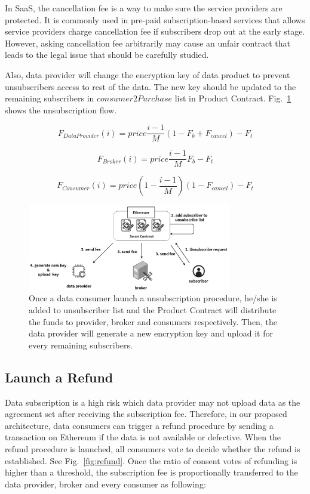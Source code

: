 \documentclass[conference]{IEEEtran}
\begin{document}
In SaaS, the cancellation fee is a way to make sure the service providers are protected. It is commonly used in pre-paid subscription-based services that allows service providers charge cancellation fee if subscribers drop out at the early stage. However, asking cancellation fee arbitrarily may cause an unfair contract that leads to the legal issue that should be carefully studied.

Also, data provider will change the encryption key of data product to prevent unsubscribers access to rest of the data. The new key should be updated to the remaining subscribers in $consumer2Purchase$ list in Product Contract. Fig.~\ref{fig:unsubscribe} shows the unsubscription flow.

\begin{equation}
\label{equation:unsubscribe_provider}
    F_{DataProvider}(i) = price \frac{i-1}{M} (1-F_{b}+F_{cancel}) -F_{t} 
\end{equation}

\begin{equation}
\label{equation:unsubscribe_broker}
    F_{Broker}(i) = price \frac{i-1}{M} F_{b} -F_{t}
\end{equation}

\begin{equation}
\label{equation:unsubscribe_consumer}
    F_{Consumer}(i) = price (1-\frac{i-1}{M})(1 -F_{cancel}) -F_{t}
\end{equation}

\begin{figure}[h]
    \centering
    \includegraphics[width=3.5in]{unsubscribe}
    \caption{Once a data consumer launch a unsubscription procedure, he/she is added to unsubscriber list and the Product Contract will distribute the funds to provider, broker and consumers respectively. Then, the data provider will generate a new encryption key and upload it for every remaining subscribers.}
    \label{fig:unsubscribe}
\end{figure}

\subsection{Launch a Refund}
Data subscription is a high risk which data provider may not upload data as the agreement set after receiving the subscription fee. Therefore, in our proposed architecture, data consumers can trigger a refund procedure by sending a transaction on Ethereum if the data is not available or defective. When the refund procedure is launched, all consumers vote to decide whether the refund is established. See Fig.~\ref{fig:refund}. Once the ratio of consent votes of refunding is higher than a threshold, the subscription fee is proportionally transferred to the data provider, broker and every consumer as following:
\end{document}
